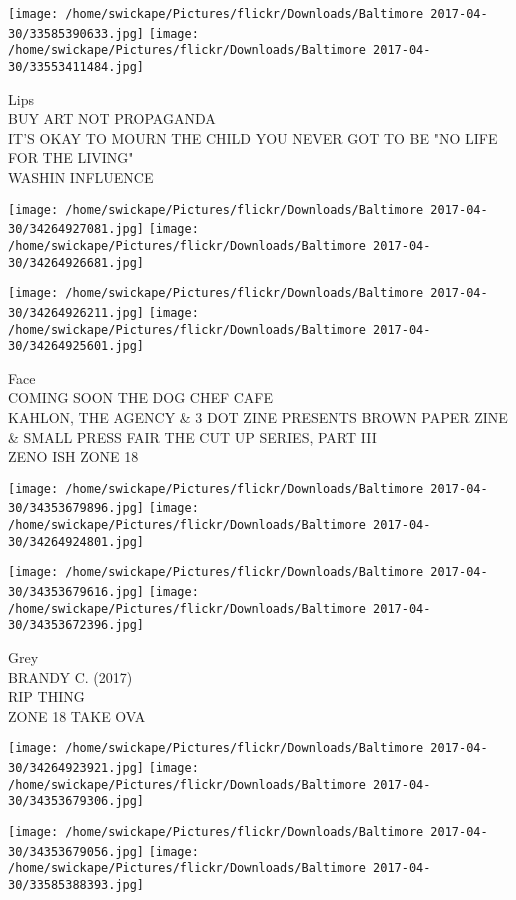 \documentclass[10pt,letterpaper]{article}
\begin{document}
\texttt{[image: /home/swickape/Pictures/flickr/Downloads/Baltimore 2017-04-30/33585390633.jpg]}
\texttt{[image: /home/swickape/Pictures/flickr/Downloads/Baltimore 2017-04-30/33553411484.jpg]}

Lips\\
BUY ART NOT PROPAGANDA\\
IT'S OKAY TO MOURN THE CHILD YOU NEVER GOT TO BE "NO LIFE FOR THE LIVING"\\
WASHIN INFLUENCE\\
\pagebreak

\texttt{[image: /home/swickape/Pictures/flickr/Downloads/Baltimore 2017-04-30/34264927081.jpg]}
\texttt{[image: /home/swickape/Pictures/flickr/Downloads/Baltimore 2017-04-30/34264926681.jpg]}

\texttt{[image: /home/swickape/Pictures/flickr/Downloads/Baltimore 2017-04-30/34264926211.jpg]}
\texttt{[image: /home/swickape/Pictures/flickr/Downloads/Baltimore 2017-04-30/34264925601.jpg]}

Face\\
COMING SOON THE DOG CHEF CAFE\\
KAHLON, THE AGENCY \& 3 DOT ZINE PRESENTS BROWN PAPER ZINE \& SMALL PRESS FAIR THE CUT UP SERIES, PART III\\
ZENO ISH ZONE 18\\
\pagebreak

\texttt{[image: /home/swickape/Pictures/flickr/Downloads/Baltimore 2017-04-30/34353679896.jpg]}
\texttt{[image: /home/swickape/Pictures/flickr/Downloads/Baltimore 2017-04-30/34264924801.jpg]}

\texttt{[image: /home/swickape/Pictures/flickr/Downloads/Baltimore 2017-04-30/34353679616.jpg]}
\texttt{[image: /home/swickape/Pictures/flickr/Downloads/Baltimore 2017-04-30/34353672396.jpg]}

Grey\\
BRANDY C. (2017)\\
RIP THING\\
ZONE 18 TAKE OVA\\
\pagebreak

\texttt{[image: /home/swickape/Pictures/flickr/Downloads/Baltimore 2017-04-30/34264923921.jpg]}
\texttt{[image: /home/swickape/Pictures/flickr/Downloads/Baltimore 2017-04-30/34353679306.jpg]}

\texttt{[image: /home/swickape/Pictures/flickr/Downloads/Baltimore 2017-04-30/34353679056.jpg]}
\texttt{[image: /home/swickape/Pictures/flickr/Downloads/Baltimore 2017-04-30/33585388393.jpg]}
\end{document}
